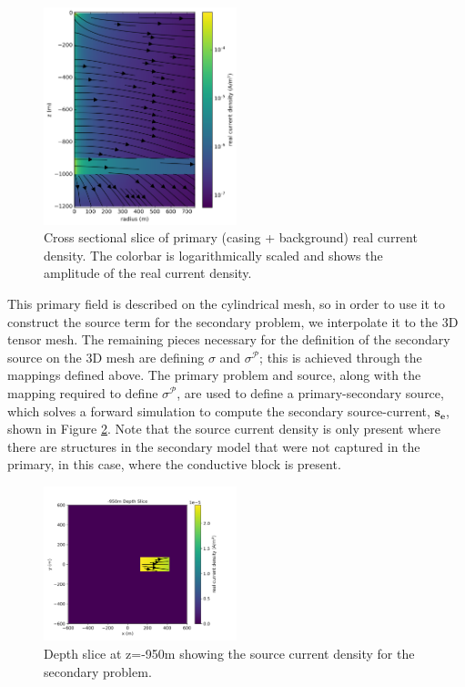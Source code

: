 \documentclass[preprint,review,3p,times,onecolumn,authoryear]{elsarticle}
\begin{document}
{%
\begin{figure}[htb!]
    \centering
    \includegraphics[width=0.5\textwidth]{images/primaryCurrents.png}
\caption{Cross sectional slice of primary (casing + background) real current density. The colorbar is logarithmically scaled and shows the amplitude of the real current density. }
\label{fig:casingPrimaryFields}
\end{figure}
}

This primary field is described on the cylindrical mesh, so in order to use it
to construct the source term for the secondary problem, we interpolate
it to the 3D tensor mesh. The remaining pieces necessary for the definition of
the secondary source on the 3D mesh are defining $\sigma$ and $\sigma^\mathcal{P}$; this
is achieved through the mappings defined above. The primary problem and
source, along with the mapping required to define $\sigma^\mathcal{P}$, are used to
define a primary-secondary source, which solves a forward simulation to
compute the secondary source-current, $\mathbf{s_e}$, shown in Figure
\ref{fig:casingSecondary}. Note that the source current density is only
present where there are structures in the secondary model that were not
captured in the primary, in this case, where the conductive block is present.

{%
\begin{figure}[htb!]
    \centering
    \includegraphics[width=0.5\textwidth]{images/secondarySource.png}
\caption{Depth slice at z=-950m showing the source current density for the secondary problem.}
\label{fig:casingSecondary}
\end{figure}
}
\end{document}
